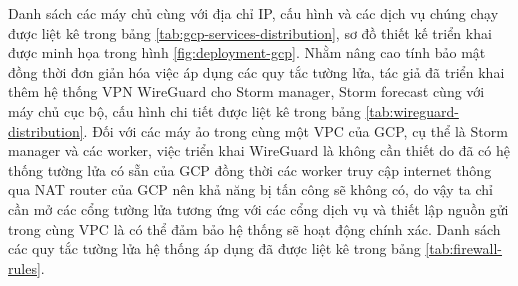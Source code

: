 \begin{table}[h]
    \centering
    \caption{Bảng danh sách các quy tắc tường lửa}
    \label{tab:firewall-rules}
\end{table}

Danh sách các máy chủ cùng với địa chỉ IP, cấu hình và các dịch vụ chúng chạy được liệt kê trong bảng \ref{tab:gcp-services-distribution}, sơ đồ thiết kế triển khai được minh họa trong hình \ref{fig:deployment-gcp}. Nhằm nâng cao tính bảo mật đồng thời đơn giản hóa việc áp dụng các quy tắc tường lửa, tác giả đã triển khai thêm hệ thống VPN WireGuard cho Storm manager, Storm forecast cùng với máy chủ cục bộ, cấu hình chi tiết được liệt kê trong bảng \ref{tab:wireguard-distribution}. Đối với các máy ảo trong cùng một VPC của GCP, cụ thể là Storm manager và các worker, việc triển khai WireGuard là không cần thiết do đã có hệ thống tường lửa có sẵn của GCP đồng thời các worker truy cập internet thông qua NAT router của GCP nên khả năng bị tấn công sẽ không có, do vậy ta chỉ cần mở các cổng tường lửa tương ứng với các cổng dịch vụ và thiết lập nguồn gửi trong cùng VPC là có thể đảm bảo hệ thống sẽ hoạt động chính xác. Danh sách các quy tắc tường lửa hệ thống áp dụng đã được liệt kê trong bảng \ref{tab:firewall-rules}.

